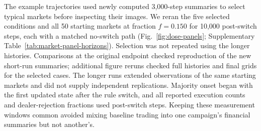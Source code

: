 The example trajectories used newly computed 3,000-step summaries to
select typical markets before inspecting their images. We reran the five
selected conditions and all 50 starting markets at fraction $f=0.150$ for 10,000
post-switch steps, each with a matched no-switch path
(Fig.~\ref{fig:dose-panels}; Supplementary Table~\ref{tab:market-panel-horizons}).
Selection was not repeated using the longer histories. Comparisons at the
original endpoint checked reproduction of the new short-run summaries;
additional figure reruns checked full histories and final grids for the
selected cases. The longer runs extended observations of the same
starting markets and did not supply independent replications. Majority
onset began with the first updated state after the rule switch, and all
reported execution counts and dealer-rejection fractions used
post-switch
steps. Keeping these measurement windows common avoided mixing baseline
trading into one campaign's financial summaries but not another's.






